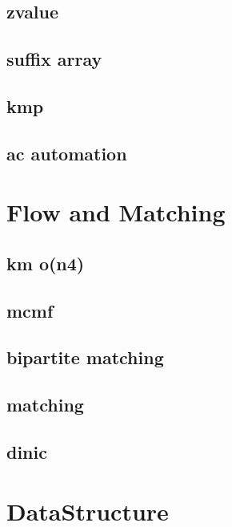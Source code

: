 \subsection{zvalue}

\subsection{suffix array}

\subsection{kmp}

\subsection{ac automation}


\section{Flow and Matching}
\subsection{km o(n4)}

\subsection{mcmf}

\subsection{bipartite matching}

\subsection{matching}

\subsection{dinic}


\section{DataStructure}
